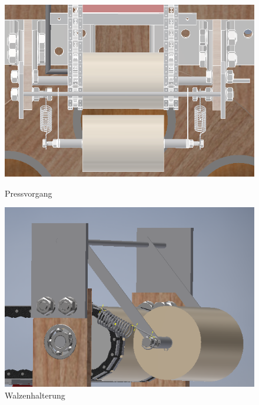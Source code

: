 \begin{figure}[H]
   \begin{minipage}[hbt]{.4\linewidth} %
      \includegraphics[width=\linewidth]{Bilder/Inventor/Walzen_Ansicht}
      \caption{Pressvorgang}
      \label{Pressvorgang_Inventor} 
   \end{minipage}
   \hspace{.2\linewidth}%
   \begin{minipage}[hbt]{.4\linewidth} %
      \includegraphics[width=\linewidth]{Bilder/Inventor/Aufhaengungs_Ansicht}
      \caption{Walzenhalterung}
      \label{Walzen_Halterung_Inventor}
   \end{minipage}
\end{figure}

